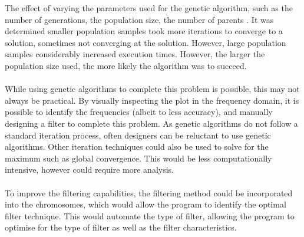 \documentclass[a4paper, 11pt]{article}
\begin{document}
    The effect of varying the parameters used for  the genetic algorithm, such as the number of generations, the population
    size, the number of parents \cite{Garip2018}. It was determined smaller population samples took more iterations to converge
    to a solution, sometimes not converging at the solution. However, large population samples considerably increased execution 
    times. However, the larger the population size used, the more likely the algorithm was to succeed. 
    \\\\
    While using genetic algorithms to complete this problem is possible, this may not always be practical\cite[]{Yu2003}. By 
    visually inspecting the plot in the frequency domain, it is possible to identify the frequencies (albeit to less accuracy), 
    and manually designing a filter to complete this problem. As genetic algorithms do not follow a standard iteration process, 
    often designers can be reluctant to use genetic algorithms. Other iteration techniques could also be used to solve for the 
    maximum such as global convergence. This would be less computationally intensive, however could require more analysis. 
    \\\\
    To improve the filtering capabilities, the filtering method could be incorporated into the chromosomes, which
    would allow the program to identify the optimal filter technique. This would automate the type of filter, allowing
    the program to optimise for the type of filter as well as the filter characteristics. 
\end{document}
